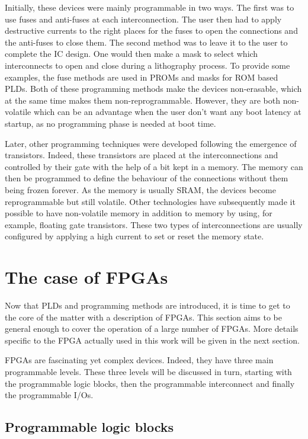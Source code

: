 Initially, these devices were mainly programmable in two ways. The first was to use fuses and 
anti-fuses at each interconnection. The user then had to apply destructive currents to the right 
places for the fuses to open the connections and the anti-fuses to close them. The second method was 
to leave it to the user to complete the IC design. One would then make a mask to select which 
interconnects to open and close during a lithography process. To provide some examples, the fuse 
methods are used in PROMs and 
masks for ROM based PLDs. Both of these programming methods make the devices non-erasable, which at 
the same time makes them non-reprogrammable. However, they are both non-volatile which can be an 
advantage when the user don't want any boot latency at startup, as no programming phase is needed at boot
time.

Later, other programming techniques were developed following the emergence of transistors. Indeed, 
these transistors are placed at the interconnections and controlled by their gate with the help of 
a bit kept in a memory. The memory can then be programmed to define the behaviour of the connections 
without them being frozen forever. As the memory is usually SRAM, the devices become reprogrammable
but still volatile. Other technologies have subsequently made it possible to have non-volatile 
memory in addition to memory by using, for example, floating gate transistors. These two types of 
interconnections are usually configured by applying a high current to set or reset the memory state. 

\section{The case of FPGAs}

Now that PLDs and programming methods are introduced, it is time to get to the 
core of the matter with a description of FPGAs.  This section aims to be general 
enough to cover the operation of a large number of FPGAs. More details specific to the FPGA actually used in this work will be given in the next 
section.

FPGAs are fascinating yet complex devices.  %
Indeed, they have three main programmable levels. These 
three levels will be discussed in turn, starting with the programmable logic blocks, then the 
programmable interconnect and finally the programmable I/Os. 

\subsection{Programmable logic blocks}

